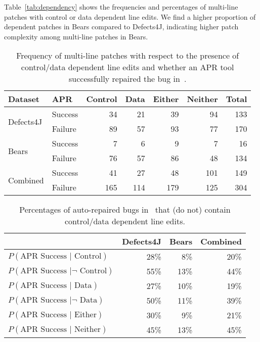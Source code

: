 \documentclass[sigconf, timestamp-false, anonymous=true]{acmart}
\begin{document}
Table~\ref{tab:dependency} shows the 
frequencies and percentages of multi-line patches with control or data dependent 
line edits. We find a higher proportion of dependent patches in Bears compared to 
Defects4J, indicating higher patch complexity among multi-line patches in Bears.


\begin{table}
{\begin{center}
	\begin{tabular}{l | l | r r r r | r}
		\toprule
		Dataset & APR & Control & Data & Either & Neither & Total \\
		\midrule
		\multirow{2}{*}{Defects4J} & Success & 34 & 21 & 39 & 94 & 133 \\
		                                          & Failure   &  89 & 57 & 93 & 77 & 170 \\
		\multirow{2}{*}{Bears}       & Success &    7 &   6 &   9 &   7 &   16 \\
		                                          & Failure   &  76 & 57 & 86 & 48 & 134 \\
		\midrule
		\multirow{2}{*}{Combined}& Success &  41 & 27 & 48 &101& 149 \\
		                                          & Failure   &165 &114&179&125& 304 \\
	\end{tabular}
 \end{center}
}
	\caption{Frequency of multi-line patches with respect to the presence of 
	control/data dependent line edits and whether an APR tool successfully 
	repaired the bug in~\cite{durieux-repair-them-all}.}
	\label{tab:dependency-repair-contingency-table}
\end{table}

\begin{table}
{\begin{center}
	\begin{tabular}{l | rrr}
            	\toprule
		& Defects4J & Bears & Combined \\
		\midrule
		$P(\mbox{APR Success } | \mbox{ Control})$ & 28\% &  8\% & 20\% \\
		$P(\mbox{APR Success } | \neg \mbox{ Control})$ & 55\% & 13\% & 44\% \\
		$P(\mbox{APR Success } | \mbox{ Data})$ & 27\% & 10\% & 19\%\\
		$P(\mbox{APR Success } | \neg \mbox{ Data})$ & 50\% & 11\% & 39\% \\
		$P(\mbox{APR Success } | \mbox{ Either})$ & 30\% & 9\% & 21\% \\
		$P(\mbox{APR Success } | \mbox{ Neither})$ & 45\% & 13\% & 45\% \\
		\bottomrule
	\end{tabular}
 \end{center}
}
	\caption{Percentages of auto-repaired bugs in~\cite{durieux-repair-them-all} 
	that (do not) contain control/data dependent line edits.}
	\label{tab:dependency-repair-percents}
\end{table}
\end{document}
